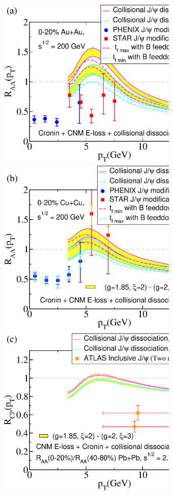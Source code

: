 \documentclass[article,showpacs,preprintnumbers,amsmath,amssymb]{revtex4}
\begin{document}
\begin{figure}[!b]
\vspace*{.2in}
\includegraphics[width=3.38in,angle=0]{fig16_rhic0200auaucronin.eps} 
\includegraphics[width=3.38in,angle=0]{fig17_rhic0200cucucronin.eps} 
\includegraphics[width=3.38in,angle=0]{fig18_lhc2760pbpbcroninrcp.eps} 

\end{figure}
\end{document}
